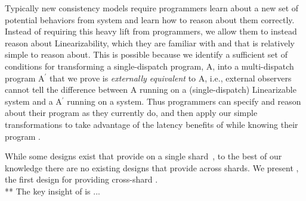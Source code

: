 
Typically new consistency models require programmers learn about a new set of potential behaviors from system and learn how to reason about them correctly.
Instead of requiring this heavy lift from programmers, we allow them to instead reason about Linearizability, which they are familiar with and that is relatively simple to reason about.
This is possible because we identify a sufficient set of conditions for transforming a single-dispatch program, A, into a multi-dispatch program A$^\prime$ that we prove is \textit{externally equivalent} to A, i.e., external observers cannot tell the difference between A running on a (single-dispatch) Linearizable system and a A$^\prime$ running on a \mdl{} system.
Thus programmers can specify and reason about their program as they currently do, and then apply our simple transformations to take advantage of the latency benefits of \mdl{} while knowing their program .


While some designs exist that provide \mdl{} on a single shard~\cite{ongaro_thesis}, to the best of our knowledge there are no existing designs that provide \mdl{} across shards.
We present \sys{}, the first design for providing cross-shard \mdl{}.\\
** The key insight of \sys{} is ...\\

